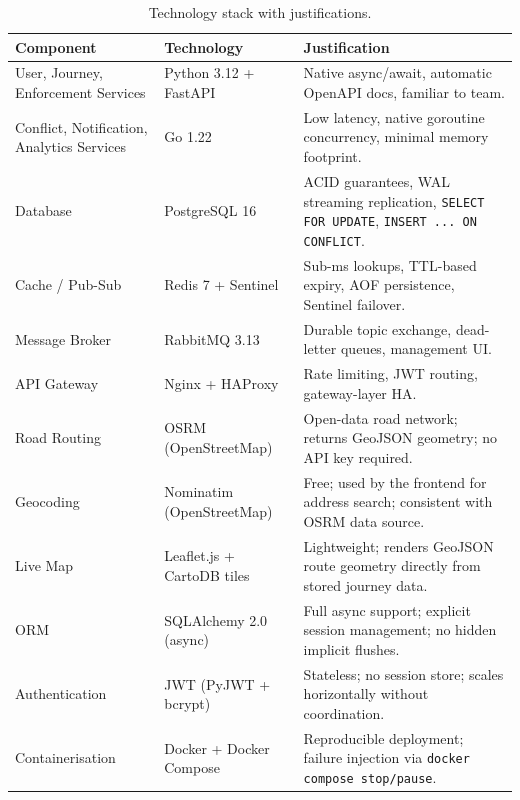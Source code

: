\documentclass[12pt,a4paper]{article}
\begin{document}
\begin{table}[H]
\centering
\small
\begin{tabularx}{\textwidth}{L{3cm} L{3.8cm} X}
  \toprule
  \textbf{Component} & \textbf{Technology} & \textbf{Justification} \\
  \midrule
  User, Journey, Enforcement Services & Python 3.12 + FastAPI
    & Native async/await, automatic OpenAPI docs, familiar to team. \\
  \addlinespace[0.1cm]
  Conflict, Notification, Analytics Services & Go 1.22
    & Low latency, native goroutine concurrency, minimal memory footprint. \\
  \addlinespace[0.1cm]
  Database        & PostgreSQL 16
    & ACID guarantees, WAL streaming replication, \texttt{SELECT FOR UPDATE}, \texttt{INSERT ... ON CONFLICT}. \\
  \addlinespace[0.1cm]
  Cache / Pub-Sub & Redis 7 + Sentinel
    & Sub-ms lookups, TTL-based expiry, AOF persistence, Sentinel failover. \\
  \addlinespace[0.1cm]
  Message Broker  & RabbitMQ 3.13
    & Durable topic exchange, dead-letter queues, management UI. \\
  \addlinespace[0.1cm]
  API Gateway     & Nginx + HAProxy
    & Rate limiting, JWT routing, gateway-layer HA. \\
  \addlinespace[0.1cm]
  Road Routing    & OSRM (OpenStreetMap)
    & Open-data road network; returns GeoJSON geometry; no API key required. \\
  \addlinespace[0.1cm]
  Geocoding       & Nominatim (OpenStreetMap)
    & Free; used by the frontend for address search; consistent with OSRM data source. \\
  \addlinespace[0.1cm]
  Live Map        & Leaflet.js + CartoDB tiles
    & Lightweight; renders GeoJSON route geometry directly from stored journey data. \\
  \addlinespace[0.1cm]
  ORM             & SQLAlchemy 2.0 (async)
    & Full async support; explicit session management; no hidden implicit flushes. \\
  \addlinespace[0.1cm]
  Authentication  & JWT (PyJWT + bcrypt)
    & Stateless; no session store; scales horizontally without coordination. \\
  \addlinespace[0.1cm]
  Containerisation & Docker + Docker Compose
    & Reproducible deployment; failure injection via \texttt{docker compose stop/pause}. \\
  \bottomrule
\end{tabularx}
\caption{Technology stack with justifications.}
\end{table}
\end{document}

